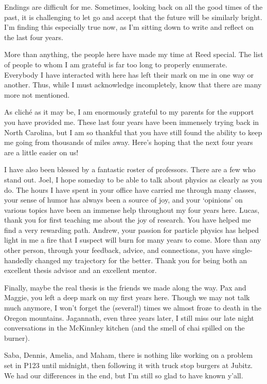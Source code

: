\documentclass[../thesis.tex]{subfiles}
\begin{document}
	Endings are difficult for me. Sometimes, looking back on all the good times of the past, it is challenging to let go and accept that the future will be similarly bright. I'm finding this especially true now, as I'm sitting down to write and reflect on the last four years.

	More than anything, the people here have made my time at Reed special. The list of people to whom I am grateful is far too long to properly enumerate. Everybody I have interacted with here has left their mark on me in one way or another. Thus, while I must acknowledge incompletely, know that there are many more not mentioned.

	As clich\'e as it may be, I am enormously grateful to my parents for the support you have provided me. These last four years have been immensely trying back in North Carolina, but I am so thankful that you have still found the ability to keep me going from thousands of miles away. Here's hoping that the next four years are a little easier on us!

	I have also been blessed by a fantastic roster of professors. There are a few who stand out. Joel, I hope someday to be able to talk about physics as clearly as you do. The hours I have spent in your office have carried me through many classes, your sense of humor has always been a source of joy, and your `opinions' on various topics have been an immense help throughout my four years here. Lucas, thank you for first teaching me about the joy of research. You have helped me find a very rewarding path. Andrew, your passion for particle physics has helped light in me a fire that I suspect will burn for many years to come. More than any other person, through your feedback, advice, and connections, you have single-handedly changed my trajectory for the better. Thank you for being both an excellent thesis advisor and an excellent mentor.

	Finally, maybe the real thesis is the friends we made along the way. Pax and Maggie, you left a deep mark on my first years here. Though we may not talk much anymore, I won't forget the (several!) times we almost froze to death in the Oregon mountains. Jagannath, even three years later, I still miss our late night conversations in the McKinnley kitchen (and the smell of chai spilled on the burner).

	Saba, Dennis, Amelia, and Maham, there is nothing like working on a problem set in P123 until midnight, then following it with truck stop burgers at Jubitz. We had our differences in the end, but I'm still so glad to have known y'all.
\end{document}
